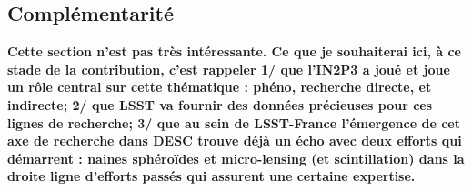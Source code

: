 \documentclass[12pt]{article}
\begin{document}
\vspace{-1em} \subsection*{Complémentarité} \vspace{-0.5em}
       {\bf Cette section n'est pas très intéressante. Ce que je souhaiterai ici, à ce stade de la contribution, c'est rappeler 1/ que l'IN2P3 a joué et joue un rôle central sur cette thématique : phéno, recherche directe, et indirecte; 2/ que LSST va fournir des données précieuses pour ces lignes de recherche; 3/ que au sein de LSST-France l'émergence de cet axe de recherche dans DESC trouve déjà un écho avec deux efforts qui démarrent : naines sphéroïdes et micro-lensing (et scintillation) dans la droite ligne d'efforts passés qui assurent une certaine expertise.}
       
\end{document}

